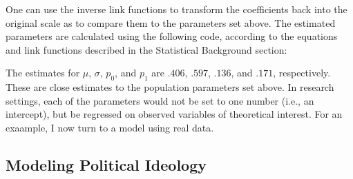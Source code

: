 \documentclass[english,man]{apa6}
\newenvironment{Shaded}{\begin{snugshade}}{\end{snugshade}}
\newcommand{\KeywordTok}[1]{\textcolor[rgb]{0.13,0.29,0.53}{\textbf{#1}}}
\newcommand{\DecValTok}[1]{\textcolor[rgb]{0.00,0.00,0.81}{#1}}
\newcommand{\StringTok}[1]{\textcolor[rgb]{0.31,0.60,0.02}{#1}}
\newcommand{\CommentTok}[1]{\textcolor[rgb]{0.56,0.35,0.01}{\textit{#1}}}
\newcommand{\ControlFlowTok}[1]{\textcolor[rgb]{0.13,0.29,0.53}{\textbf{#1}}}
\newcommand{\OperatorTok}[1]{\textcolor[rgb]{0.81,0.36,0.00}{\textbf{#1}}}
\newcommand{\NormalTok}[1]{#1}
\theoremstyle{definition}
\theoremstyle{definition}
\theoremstyle{remark}
\begin{document}
One can use the inverse link functions to transform the coefficients
back into the original scale as to compare them to the parameters set
above. The estimated parameters are calculated using the following code,
according to the equations and link functions described in the
Statistical Background section:

\begin{Shaded}
\end{Shaded}

The estimates for \(\mu\), \(\sigma\), \(p_0\), and \(p_1\) are
\(.406\), \(.597\), \(.136\), and \(.171\), respectively. These are
close estimates to the population parameters set above. In research
settings, each of the parameters would not be set to one number (i.e.,
an intercept), but be regressed on observed variables of theoretical
interest. For an exaample, I now turn to a model using real data.

\subsection{Modeling Political
Ideology}\label{modeling-political-ideology}
\end{document}
